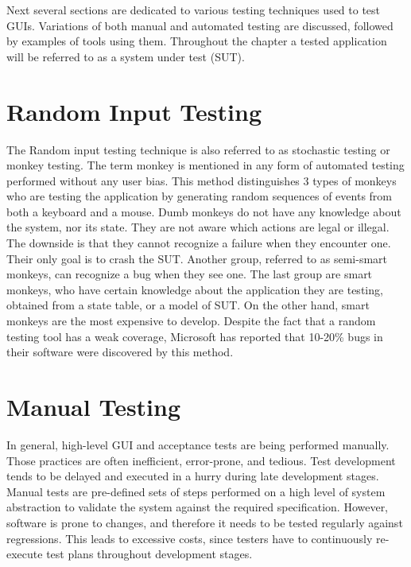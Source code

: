 Next several sections are dedicated to various testing techniques used to test GUIs. Variations of both manual and automated testing are discussed, followed by examples of tools using them. Throughout the chapter a tested application will be referred to as a system under test (SUT).

\section{Random Input Testing}
The Random input testing technique is also referred to as stochastic testing or monkey testing. The term monkey is mentioned in any form of automated testing performed without any user bias. This method distinguishes 3 types of monkeys who are testing the application by generating random sequences of events from both a keyboard and a mouse. Dumb monkeys do not have any knowledge about the system, nor its state. They are not aware which actions are legal or illegal. The downside is that they cannot recognize a failure when they encounter one. Their only goal is to crash the SUT. Another group, referred to as semi-smart monkeys, can recognize a bug when they see one. The last group are smart monkeys, who have certain knowledge about the application they are testing, obtained from a state table, or a model of SUT. On the other hand, smart monkeys are the most expensive to develop. Despite the fact that a random testing tool has a weak coverage, Microsoft has reported that 10-20\% bugs in their software were discovered by this method.\cite{nyman}

\section{Manual Testing}
In general, high-level GUI and acceptance tests are being performed manually. Those practices are often inefficient, error-prone, and tedious. Test development tends to be delayed and executed in a hurry during late development stages. Manual tests are pre-defined sets of steps performed on a high level of system abstraction to validate the system against the required specification. However, software is prone to changes, and therefore it needs to be tested regularly against regressions. This leads to excessive costs, since testers have to continuously re-execute test plans throughout development stages.\cite{guitesting}

